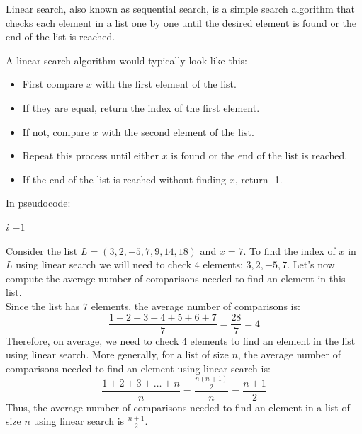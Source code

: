 \begin{definition}
    Linear search, also known as sequential search, is a simple search algorithm that checks each element in a list one by one until the desired element is found or the end of the list is reached.
\end{definition}
\begin{eg}
    A linear search algorithm would typically look like this:
    \begin{itemize}[itemsep=1pt,label=$\circ$]
        \item First compare $x$ with the first element of the list.
        \item If they are equal, return the index of the first element.
        \item If not, compare $x$ with the second element of the list.
        \item Repeat this process until either $x$ is found or the end of the list is reached.
        \item If the end of the list is reached without finding $x$, return -1.
    \end{itemize}
    In pseudocode:
    \begin{algorithmic}
                    \State \Return $i$
                \EndIf
            \EndFor
            \State \Return $-1$
        \EndFunction
    \end{algorithmic}
\end{eg}
\begin{eg}
    Consider the list $L = (3, 2, -5, 7, 9, 14, 18)$ and $x = 7$. To find the index of $x$ in $L$ using linear search we will need to check $4$ elements: $3, 2, -5, 7$. Let's now compute the average number of comparisons needed to find an element in this list. \\
    Since the list has $7$ elements, the average number of comparisons is:
    \[\frac{1 + 2 + 3 + 4 + 5 + 6 + 7}{7} = \frac{28}{7} = 4\]
    Therefore, on average, we need to check $4$ elements to find an element in the list using linear search. More generally, for a list of size $n$, the average number of comparisons needed to find an element using linear search is:
    \[\frac{1 + 2 + 3 + \ldots + n}{n} = \frac{\frac{n(n+1)}{2}}{n} = \frac{n+1}{2}\]
    Thus, the average number of comparisons needed to find an element in a list of size $n$ using linear search is $\frac{n+1}{2}$.
\end{eg}

